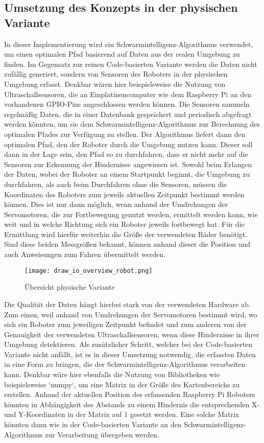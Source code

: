 \subsection{Umsetzung des Konzepts in der physischen Variante}
In dieser Implementierung wird ein Schwarmintelligenz-Algorithmus verwendet, um einen optimalen Pfad basierend auf Daten aus der realen Umgebung zu finden. Im Gegensatz zur reinen Code-basierten Variante werden die Daten nicht zufällig generiert, sondern von Sensoren des Roboters in der physischen Umgebung erfasst. Denkbar wären hier beispielsweise die Nutzung von Ultraschallsensoren, die an Einplatinencomputer wie dem Raspberry Pi an den vorhandenen GPIO-Pins angeschlossen werden können. Die Sensoren sammeln regelmäßig Daten, die in einer Datenbank gespeichert und periodisch abgefragt werden könnten, um sie dem Schwarmintelligenz-Algorithmus zur Berechnung des optimalen Pfades zur Verfügung zu stellen. Der Algorithmus liefert dann den optimalen Pfad, den der Roboter durch die Umgebung nutzen kann. Dieser soll dann in der Lage sein, den Pfad so zu durchfahren, dass er nicht mehr auf die Sensoren zur Erkennung der Hindernisse angewiesen ist. Sowohl beim Erlangen der Daten, wobei der Roboter an einem Startpunkt beginnt, die Umgebung zu durchfahren, als auch beim Durchfahren ohne die Sensoren, müssen die Koordinaten des Roboters zum jeweils aktuellen Zeitpunkt bestimmt werden können. Dies ist nur dann möglich, wenn anhand der Umdrehungen der Servomotoren, die zur Fortbewegung genutzt werden, ermittelt werden kann, wie weit und in welche Richtung sich ein Roboter jeweils fortbewegt hat. Für die Ermittlung wird hierfür weiterhin die Größe der verwendeten Räder benötigt. Sind diese beiden Messgrößen bekannt, können anhand dieser die Position und auch Anweisungen zum Fahren übermittelt werden.
\begin{figure}
    \centering
    \texttt{[image: draw\_io\_overview\_robot.png]}
    \caption{Übersicht physische Variante}
    \label{fig:Figure_2}
\end{figure}

Die Qualität der Daten hängt hierbei stark von der verwendeten Hardware ab. Zum einen, weil anhand von Umdrehungen der Servomotoren bestimmt wird, wo sich ein Roboter zum jeweiligen Zeitpunkt befindet und zum anderen von der Genauigkeit der verwendeten Ultraschallsensoren, wenn diese Hindernisse in ihrer Umgebung detektieren. Als zusätzlicher Schritt, welcher bei der Code-basierten Variante nicht anfällt, ist es in dieser Umsetzung notwendig, die erfassten Daten in eine Form zu bringen, die der Schwarmintelligenz-Algorithmus verarbeiten kann. Denkbar wäre hier ebenfalls die Nutzung von Bibliotheken wie beispielsweise `numpy`, um eine Matrix in der Größe des Kartenbereichs zu erstellen. Anhand der aktuellen Position des erfassenden Raspberry Pi Roboters könnten in Abhängigkeit des Abstands zu einem Hindernis die entsprechenden X- und Y-Koordinaten in der Matrix auf 1 gesetzt werden. Eine solche Matrix könnten dann wie in der Code-basierten Variante an den Schwarmintelligenz-Algorithmus zur Verarbeitung übergeben werden.

